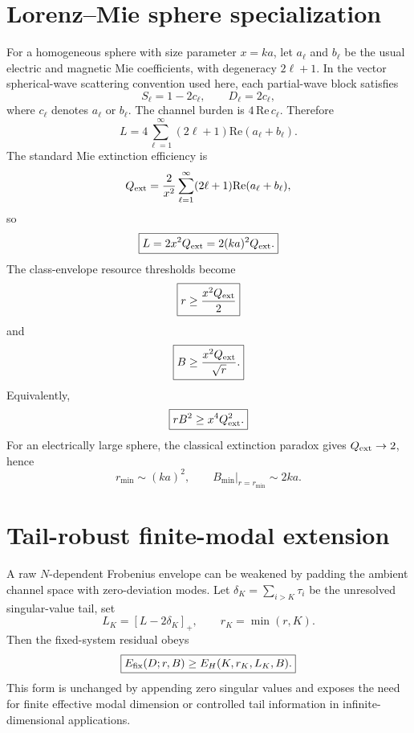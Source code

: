 \documentclass[aps,pra,onecolumn,superscriptaddress,nofootinbib]{revtex4-2}
\begin{document}
\section{Lorenz--Mie sphere specialization}
For a homogeneous sphere with size parameter $x=ka$, let $a_\ell$ and $b_\ell$ be the usual electric and magnetic Mie coefficients, with degeneracy $2\ell+1$. In the vector spherical-wave scattering convention used here, each partial-wave block satisfies
\begin{equation}
S_\ell=1-2c_\ell,\qquad D_\ell=2c_\ell,
\end{equation}
where $c_\ell$ denotes $a_\ell$ or $b_\ell$. The channel burden is $4\,\mathrm{Re}\,c_\ell$. Therefore
\begin{equation}
L=4\sum_{\ell=1}^{\infty}(2\ell+1)\mathrm{Re}(a_\ell+b_\ell).
\end{equation}
The standard Mie extinction efficiency is
\begin{equation}
Q_{\rm ext}=\frac{2}{x^2}\sum_{\ell=1}^{\infty}(2\ell+1)\mathrm{Re}(a_\ell+b_\ell),
\end{equation}
so
\begin{equation}
\boxed{L=2x^2Q_{\rm ext}=2(ka)^2Q_{\rm ext}.}
\end{equation}
The class-envelope resource thresholds become
\begin{equation}
\boxed{r\ge\frac{x^2Q_{\rm ext}}{2}}
\end{equation}
and
\begin{equation}
\boxed{B\ge\frac{x^2Q_{\rm ext}}{\sqrt r}.}
\end{equation}
Equivalently,
\begin{equation}
\boxed{rB^2\ge x^4Q_{\rm ext}^2.}
\end{equation}
For an electrically large sphere, the classical extinction paradox gives $Q_{\rm ext}\to2$, hence
\begin{equation}
\boxed{r_{\min}\sim(ka)^2,\qquad B_{\min}|_{r=r_{\min}}\sim2ka.}
\end{equation}

\section{Tail-robust finite-modal extension}
A raw $N$-dependent Frobenius envelope can be weakened by padding the ambient channel space with zero-deviation modes. Let $\delta_K=\sum_{i>K}\tau_i$ be the unresolved singular-value tail, set
\begin{equation}
L_K=[L-2\delta_K]_+,
\qquad r_K=\min(r,K).
\end{equation}
Then the fixed-system residual obeys
\begin{equation}
\boxed{E_{\rm fix}(D;r,B)\ge E_H(K,r_K,L_K,B).}
\end{equation}
This form is unchanged by appending zero singular values and exposes the need for finite effective modal dimension or controlled tail information in infinite-dimensional applications.
\end{document}
